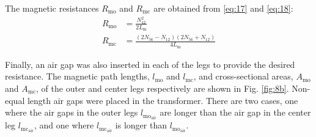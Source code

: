 \documentclass[lettersize,journal]{IEEEtran}
\begin{document}
The magnetic resistances $R_{\mathrm{mo}}$ and $R_{\mathrm{mc}}$ are obtained from \eqref{eq:17} and \eqref{eq:18}:
\begin{align}
R_{\mathrm{mo}} &= \frac{N_{12}^2}{2 L_{\mathrm{m}}} \label{eq:17}\\
R_{\mathrm{mc}} &= \frac{(2 N_{56} - N_{12})(2 N_{56} + N_{12})}{4 L_{\mathrm{m}}} \label{eq:18}
\end{align}

Finally, an air gap was also inserted in each of the legs to provide the desired resistance. The magnetic path lengths, $l_{\mathrm{mo}}$ and $l_{\mathrm{mc}}$, and cross-sectional areas, $A_{\mathrm{mo}}$ and $A_{\mathrm{mc}}$, of the outer and center legs respectively are shown in Fig. \ref{fig:8b}. Non-equal length air gaps were placed in the transformer. There are two cases, one where the air gaps in the outer legs $l_{\mathrm{mo}_{\mathrm{air}}}$ are longer than the air gap in the center leg $l_{\mathrm{mc}_{\mathrm{air}}}$, and one where $l_{\mathrm{mc}_{\mathrm{air}}}$ is longer than $l_{\mathrm{mo}_{\mathrm{air}}}$.
\end{document}
